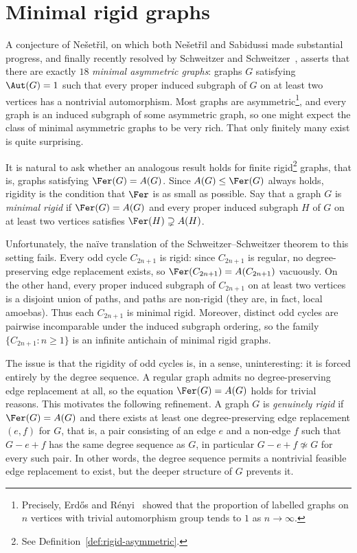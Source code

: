 \section{Minimal rigid graphs}\label{sec:minimal-rigid}

A conjecture of Ne\v{s}et\v{r}il, on which both Ne\v{s}et\v{r}il and Sabidussi made substantial progress, and finally recently resolved by Schweitzer and Schweitzer~\cite{SCHWEITZER2017215}, asserts that there are exactly $18$ \emph{minimal asymmetric graphs}: graphs $G$ satisfying $\Aut(G) = 1$ such that every proper induced subgraph of $G$ on at least two vertices has a nontrivial automorphism.
Most graphs are asymmetric\footnote{Precisely, Erd{\H o}s and R{\'e}nyi~\cite{ErdosRenyi1963} showed that the proportion of labelled graphs on $n$ vertices with trivial automorphism group tends to $1$ as $n\to\infty$.}, and every graph is an induced subgraph of some asymmetric graph, so one might expect the class of minimal asymmetric graphs to be very rich.
That only finitely many exist is quite surprising.

\schweitzerminimal*

It is natural to ask whether an analogous result holds for finite rigid\footnote{See Definition~\ref{def:rigid-asymmetric}.} graphs, that is, graphs satisfying $\Fer(G) = A(G)$.
Since $A(G) \leq \Fer(G)$ always holds, rigidity is the condition that $\Fer$ is as small as possible.
Say that a graph $G$ is \emph{minimal rigid} if $\Fer(G) = A(G)$ and every proper induced subgraph $H$ of $G$ on at least two vertices satisfies $\Fer(H) \supsetneq A(H)$.

Unfortunately, the na\"ive translation of the Schweitzer--Schweitzer theorem to this setting fails.
Every odd cycle $C_{2n+1}$ is rigid: since $C_{2n+1}$ is regular, no degree-preserving edge replacement exists, so $\Fer(C_{2n+1}) = A(C_{2n+1})$ vacuously.
On the other hand, every proper induced subgraph of $C_{2n+1}$ on at least two vertices is a disjoint union of paths, and paths are non-rigid (they are, in fact, local amoebas).
Thus each $C_{2n+1}$ is minimal rigid.
Moreover, distinct odd cycles are pairwise incomparable under the induced subgraph ordering, so the family $\{C_{2n+1} : n \geq 1\}$ is an infinite antichain of minimal rigid graphs.

The issue is that the rigidity of odd cycles is, in a sense, uninteresting: it is forced entirely by the degree sequence.
A regular graph admits no degree-preserving edge replacement at all, so the equation $\Fer(G) = A(G)$ holds for trivial reasons.
This motivates the following refinement.
A graph $G$ is \emph{genuinely rigid} if $\Fer(G) =A(G)$ and there exists at least one degree-preserving edge replacement $(e,f)$ for $G$, that is, a pair consisting of an edge $e$ and a non-edge $f$ such that $G - e + f$ has the same degree sequence as $G$, in particular $G - e + f \not\simeq G$ for every such pair.
In other words, the degree sequence permits a nontrivial feasible edge replacement to exist, but the deeper structure of $G$ prevents it.

